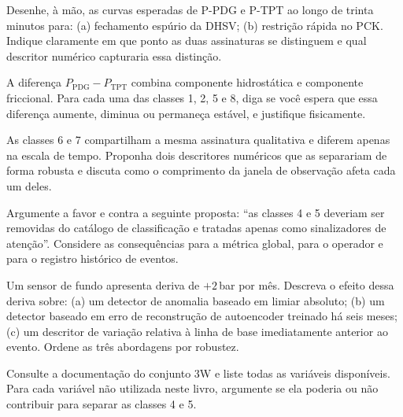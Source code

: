 
\begin{exercicios}
\item Desenhe, à mão, as curvas esperadas de P-PDG e P-TPT ao longo de trinta minutos
      para: (a) fechamento espúrio da DHSV; (b) restrição rápida no PCK. Indique
      claramente em que ponto as duas assinaturas se distinguem e qual descritor
      numérico capturaria essa distinção.

\item A diferença $P_{\text{PDG}} - P_{\text{TPT}}$ combina componente hidrostática e
      componente friccional. Para cada uma das classes 1, 2, 5 e 8, diga se você espera
      que essa diferença aumente, diminua ou permaneça estável, e justifique fisicamente.

\item As classes 6 e 7 compartilham a mesma assinatura qualitativa e diferem apenas na
      escala de tempo. Proponha dois descritores numéricos que as separariam de forma
      robusta e discuta como o comprimento da janela de observação afeta cada um deles.

\item Argumente a favor e contra a seguinte proposta: ``as classes 4 e 5 deveriam ser
      removidas do catálogo de classificação e tratadas apenas como sinalizadores de
      atenção''. Considere as consequências para a métrica global, para o operador e
      para o registro histórico de eventos.

\item Um sensor de fundo apresenta deriva de $+2$\,bar por mês. Descreva o efeito
      dessa deriva sobre: (a) um detector de anomalia baseado em limiar absoluto;
      (b) um detector baseado em erro de reconstrução de autoencoder treinado há seis
      meses; (c) um descritor de variação relativa à linha de base imediatamente
      anterior ao evento. Ordene as três abordagens por robustez.

\item Consulte a documentação do conjunto 3W \citep{VazVargas2026_3w2} e liste todas as
      variáveis disponíveis. Para cada variável não utilizada neste livro, argumente se
      ela poderia ou não contribuir para separar as classes 4 e 5.
\end{exercicios}

